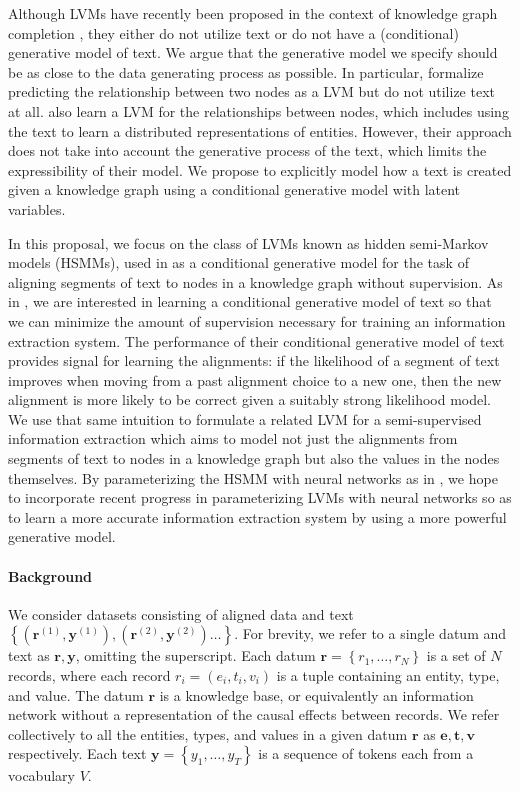\documentclass[12pt]{article}
\newcommand\set[1]{\left\{#1\right\}}
\newcommand{\be}{\mathbf{e}}
\newcommand{\br}{\mathbf{r}}
\newcommand{\bt}{\mathbf{t}}
\newcommand{\bv}{\mathbf{v}}
\newcommand{\by}{\mathbf{y}}
\begin{document}
Although LVMs have recently been proposed in the context of knowledge graph
completion \citep{chen2018diva,qu2017ssre}, they either do not utilize text
or do not have a (conditional) generative model of text.
We argue that the generative model we specify should be as close to 
the data generating process as possible.
In particular, \citet{chen2018diva} formalize predicting the relationship between two nodes
as a LVM but do not utilize text at all.
\citet{qu2017ssre} also learn a LVM for the relationships between nodes,
which includes using the text to learn a distributed representations of entities.
However, their approach does not take into account the generative process of the text,
which limits the expressibility of their model.
We propose to explicitly model how a text is created given a knowledge graph
using a conditional generative model with latent variables.

In this proposal, we focus on the class of LVMs known as hidden semi-Markov models (HSMMs),
used in \citet{liang2009semalign} as a conditional generative model for the
task of aligning segments of text to
nodes in a knowledge graph without supervision.
As in \citet{liang2009semalign}, we are interested in learning a conditional generative model of text so that
we can minimize the amount of supervision necessary for training an information extraction system.
The performance of their conditional generative model of text provides signal for learning the alignments:
if the likelihood of a segment of text improves when moving from a
past alignment choice to a new one,
then the new alignment is more likely to be correct given a suitably strong likelihood model.
We use that same intuition to formulate a related LVM for a semi-supervised information extraction
which aims to model not just the alignments from segments of text to nodes in a knowledge graph
but also the values in the nodes themselves.
By parameterizing the HSMM with neural networks as in \citet{wiseman2018template},
we hope to incorporate recent progress in parameterizing LVMs with neural networks
so as to learn a more accurate information extraction system by using a more powerful
generative model.

\paragraph{Background}
We consider datasets consisting of aligned data and text
$\set{(\br^{(1)}, \by^{(1)}),(\br^{(2)},\by^{(2)})\ldots}$.
For brevity, we refer to a single datum and text as $\br,\by$, omitting the superscript.
Each datum $\br = \set{r_1,\ldots,r_N}$ is a set of $N$ records, where each record $r_i = (e_i, t_i, v_i)$
is a tuple containing an entity, type, and value.
The datum $\br$ is a knowledge base, or equivalently an information network
without a representation of the causal effects between records.
We refer collectively to all the entities, types, and values in a given datum $\br$ as
$\be,\bt,\bv$ respectively.
Each text $\by = \set{y_1,\ldots,y_T}$ is a sequence of tokens each from a vocabulary $V$.
\end{document}
